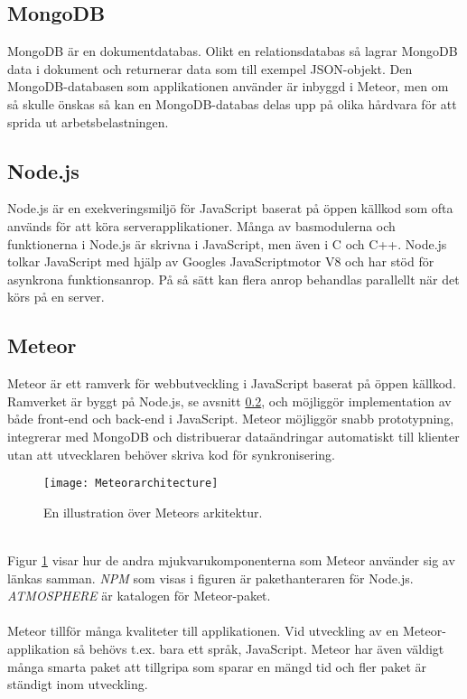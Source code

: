 \subsection{MongoDB}
\label{subsec:mongodb}
MongoDB är en dokumentdatabas. Olikt en relationsdatabas så lagrar MongoDB data i dokument och returnerar data som till exempel JSON-objekt. Den MongoDB-databasen som applikationen använder är inbyggd i Meteor, men om så skulle önskas så kan en MongoDB-databas delas upp på olika hårdvara för att sprida ut arbetsbelastningen. \cite{website:mongodb}

\subsection{Node.js}
\label{subsec:node}
Node.js är en exekveringsmiljö för JavaScript baserat på öppen källkod som ofta används för att köra serverapplikationer. Många av basmodulerna och funktionerna i Node.js är skrivna i JavaScript, men även i C och C++. Node.js tolkar JavaScript med hjälp av Googles JavaScriptmotor V8 och har stöd för asynkrona funktionsanrop. På så sätt kan flera anrop behandlas parallellt när det körs på en server. \cite{website:nodejs}

\subsection{Meteor}
\label{subsec:meteor}
Meteor är ett ramverk för webbutveckling i JavaScript baserat på öppen källkod. Ramverket är byggt på Node.js, se avsnitt \ref{subsec:node}, och möjliggör implementation av både front-end och back-end i JavaScript. Meteor möjliggör snabb prototypning, integrerar med MongoDB och distribuerar dataändringar automatiskt till klienter utan att utvecklaren behöver skriva kod för synkronisering. \cite{website:meteor}

\begin{figure}[h]
  \centering
  \texttt{[image: Meteorarchitecture]}
  \caption{En illustration över Meteors arkitektur.}
  \label{fig:meteorarchitecture}
\end{figure}
\ \\
Figur \ref{fig:meteorarchitecture} visar hur de andra mjukvarukomponenterna som Meteor använder sig av länkas samman. \textit{NPM} som visas i figuren är pakethanteraren för Node.js.\cite{website:npm} \textit{ATMOSPHERE} är katalogen för Meteor-paket.
\\ \\
Meteor tillför många kvaliteter till applikationen. Vid utveckling av en Meteor-applikation så behövs
t.ex. bara ett språk, JavaScript. Meteor har även väldigt många smarta paket att
tillgripa som sparar en mängd tid och fler paket är ständigt inom utveckling. \cite{website:atmosphere}

